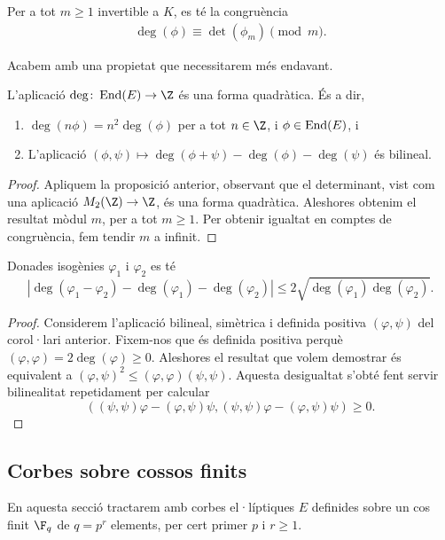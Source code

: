 \begin{theorem}
Per a tot $m\geq 1$ invertible a $K$, es té la congruència
\begin{align*}
 \deg(\phi)\equiv \det(\phi_m)\pmod{m}.
\end{align*}
\end{theorem}

Acabem amb una propietat que necessitarem més endavant.
\begin{corollary}
L'aplicació $\deg\colon\End(E)\to\Z$ és una forma quadràtica. És a dir,
\begin{enumerate}
    \item $\deg(n\phi)=n^2\deg(\phi)$ per a tot $n\in \Z$, i $\phi\in \operatorname{End}(E)$, i
    \item L'aplicació
    $(\phi,\psi)\mapsto \deg(\phi+\psi)-\deg(\phi)-\deg(\psi)$ és bilineal.
\end{enumerate} 
\end{corollary}
\begin{proof}
 Apliquem la proposició anterior, observant que el determinant, vist com una aplicació $M_2(\Z)\to \Z$, és una forma quadràtica. Aleshores obtenim el resultat mòdul $m$, per a tot $m\geq 1$. Per obtenir igualtat en comptes de congruència, fem tendir $m$ a infinit.
\end{proof}

\begin{proposition}
Donades isogènies $\varphi_1$ i $\varphi_2$ es té
\[
|\deg(\varphi_1-\varphi_2)-\deg(\varphi_1)-\deg(\varphi_2)|\leq 2\sqrt{\deg(\varphi_1)\deg(\varphi_2)}.
\]
\end{proposition}
\begin{proof}
Considerem l'aplicació bilineal, simètrica i definida positiva $(\varphi, \psi)$ del corol·lari anterior. Fixem-nos que és definida positiva perquè $(\varphi,\varphi)=2\deg(\varphi)\geq 0$. Aleshores el resultat que volem demostrar és equivalent a $(\varphi,\psi)^2\leq (\varphi,\varphi)(\psi,\psi)$.
Aquesta desigualtat s'obté fent servir bilinealitat repetidament per calcular
\[
((\psi,\psi)\varphi - (\varphi,\psi)\psi,(\psi,\psi)\varphi - (\varphi,\psi)\psi)\geq 0.
\]
\end{proof}

 \subsection{Corbes sobre cossos finits}
 
 En aquesta secció tractarem amb corbes el·líptiques $E$ definides sobre un cos finit $\F_q$ de $q=p^r$ elements, per cert primer $p$ i $r\geq 1$.

